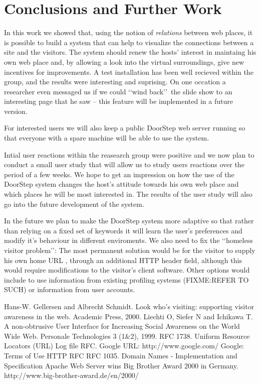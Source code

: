 \documentclass[a4paper]{danarticle}
\theoremstyle{remark}
\begin{document}
  \section{Conclusions and Further Work} In this work we showed that, using 
    the notion of \textit{relations} between web places, it is possible to build 
    a system that can help to visualize the connections between a site and the 
    visitors. The system should renew the hosts' interest in maintaing his own 
    web place and, by allowing a look into the virtual surroundings, give new 
    incentives for improvements. A test installation has been well recieved 
    within the group, and the results were interesting and suprising. On one 
    occation a researcher even messaged us if we could \lq\lq wind back\rq\rq\ 
    the slide show to an interesting page that he saw -- this feature will be 
    implemented in a future version.
    
    For interested users we will also keep a public DoorStep web server running
    so that everyone with a spare machine will be able to use the system.
    
    Intial user reactions within the reasearch group were positive and we now
    plan to conduct a small user study that will allow us to study users
    reactions over the period of a few weeks. We hope to get an impression on how
    the use of the DoorStep system changes the host's attitude towards his own
    web place and which places he will be most interested in. The results of the
    user study will also go into the future development of the system.
    
    In the future we plan to make the DoorStep system more adaptive so that
    rather than relying on a fixed set of keywords it will learn the user's
    preferences and modify it's behaviour in different enviroments. We also need
    to fix the \lq\lq homeless visitor problem\rq\rq : The most permanent
    solution would be for the visitor to supply his own home URL \cite{webaware},
    through an additional HTTP header field, although this would require
    modifications to the visitor's client software. Other options would include
    to use information from existing profiling systems (FIXME:REFER TO SUCH) or
    information from user accounts.
  \begin{thebibliography}{99}
     Hans-W. Gellersen and Albrecht Schmidt.
    Look who's visiting: supporting visitor awareness in the web.
    Academic Press, 2000.
     Liechti O, Siefer N and Ichikawa T.
    A non-obtrusive User Interface for Increasing Social Awareness on the 
    World Wide Web. Personale Technologies 3 (1\&2), 1999.
     RFC 1738. Uniform Resource Locators (URL) 
     Log file RFC.
     Google URL: http://www.google.com/
     Google: Terms of Use
     HTTP RFC
     RFC 1035. Domain Names - Implementation and Specification
    \bibitem{bigBro} Apache Web Server wins Big Brother Award 2000 in Germany.
    http://www.big-brother-award.de/en/2000/
  \end{thebibliography}
\end{document}
